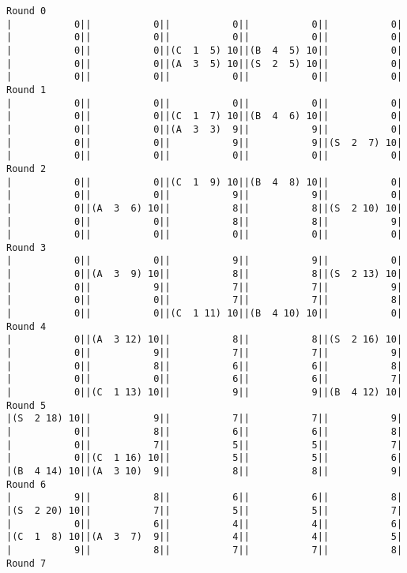 \begin{verbatim}
Round 0
|           0||           0||           0||           0||           0|
|           0||           0||           0||           0||           0|
|           0||           0||(C  1  5) 10||(B  4  5) 10||           0|
|           0||           0||(A  3  5) 10||(S  2  5) 10||           0|
|           0||           0||           0||           0||           0|
Round 1
|           0||           0||           0||           0||           0|
|           0||           0||(C  1  7) 10||(B  4  6) 10||           0|
|           0||           0||(A  3  3)  9||           9||           0|
|           0||           0||           9||           9||(S  2  7) 10|
|           0||           0||           0||           0||           0|
Round 2
|           0||           0||(C  1  9) 10||(B  4  8) 10||           0|
|           0||           0||           9||           9||           0|
|           0||(A  3  6) 10||           8||           8||(S  2 10) 10|
|           0||           0||           8||           8||           9|
|           0||           0||           0||           0||           0|
Round 3
|           0||           0||           9||           9||           0|
|           0||(A  3  9) 10||           8||           8||(S  2 13) 10|
|           0||           9||           7||           7||           9|
|           0||           0||           7||           7||           8|
|           0||           0||(C  1 11) 10||(B  4 10) 10||           0|
Round 4
|           0||(A  3 12) 10||           8||           8||(S  2 16) 10|
|           0||           9||           7||           7||           9|
|           0||           8||           6||           6||           8|
|           0||           0||           6||           6||           7|
|           0||(C  1 13) 10||           9||           9||(B  4 12) 10|
Round 5
|(S  2 18) 10||           9||           7||           7||           9|
|           0||           8||           6||           6||           8|
|           0||           7||           5||           5||           7|
|           0||(C  1 16) 10||           5||           5||           6|
|(B  4 14) 10||(A  3 10)  9||           8||           8||           9|
Round 6
|           9||           8||           6||           6||           8|
|(S  2 20) 10||           7||           5||           5||           7|
|           0||           6||           4||           4||           6|
|(C  1  8) 10||(A  3  7)  9||           4||           4||           5|
|           9||           8||           7||           7||           8|
Round 7

\end{verbatim}
